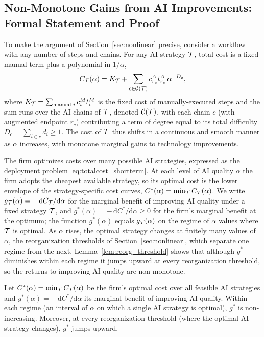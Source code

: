 \subsection{Non-Monotone Gains from AI Improvements: Formal Statement and Proof}
\label{app:nonmonotone}

To make the argument of Section~\ref{sec:nonlinear} precise, consider a workflow with any number of steps and chains.
For any AI strategy $\mathcal{T}$, total cost is a fixed manual term plus a polynomial in $1/\alpha$,
\begin{equation}
\label{eq:strategy_cost}
C_{\mathcal{T}}(\alpha) = K_{\mathcal{T}} + \sum_{c \in \mathcal{C}(\mathcal{T})} c^{A}_{r_c}t^{A}_{r_c}\,\alpha^{-D_c},
\end{equation}
where $K_{\mathcal{T}} = \sum_{\text{manual } i} c^{M}_{i}t^{M}_{i}$ is the fixed cost of manually-executed steps and the sum runs over the AI chains of $\mathcal{T}$, denoted $\mathcal{C}(\mathcal{T})$, with each chain $c$ (with augmented endpoint $r_c$) contributing a term of degree equal to its total difficulty $D_c = \sum_{i \in c} d_i \ge 1$.
The cost of $\mathcal{T}$ thus shifts in a continuous and smooth manner as $\alpha$ increases, with monotone marginal gains to technology improvements.

The firm optimizes costs over many possible AI strategies, expressed as the deployment problem \eqref{eq:totalcost_shortterm}.
At each level of AI quality $\alpha$ the firm adopts the cheapest available strategy, so its optimal cost is the lower envelope of the strategy-specific cost curves, $C^*(\alpha) = \min_{\mathcal{T}} C_{\mathcal{T}}(\alpha)$.
We write $g_{\mathcal{T}}(\alpha) = -\,\mathrm{d}C_{\mathcal{T}}/\mathrm{d}\alpha$ for the marginal benefit of improving AI quality under a fixed strategy $\mathcal{T}$, and $g^*(\alpha) = -\,\mathrm{d}C^*/\mathrm{d}\alpha \ge 0$ for the firm's marginal benefit at the optimum; the function $g^*(\alpha)$ equals $g_{\mathcal{T}}(\alpha)$ on the regime of $\alpha$ values where $\mathcal{T}$ is optimal.
As $\alpha$ rises, the optimal strategy changes at finitely many values of $\alpha$, the reorganization thresholds of Section~\ref{sec:nonlinear}, which separate one regime from the next.
Lemma~\ref{lem:reorg_threshold} shows that although $g^*$ diminishes within each regime it jumps upward at every reorganization threshold, so the returns to improving AI quality are non-monotone.

\begin{lem}
\label{lem:reorg_threshold}
Let $C^*(\alpha) = \min_{\mathcal{T}} C_{\mathcal{T}}(\alpha)$ be the firm's optimal cost over all feasible AI strategies and $g^*(\alpha) = -\,\mathrm{d}C^*/\mathrm{d}\alpha$ its marginal benefit of improving AI quality.
Within each regime (an interval of $\alpha$ on which a single AI strategy is optimal), $g^*$ is non-increasing.
Moreover, at every reorganization threshold (where the optimal AI strategy changes), $g^*$ jumps upward.
\end{lem}

